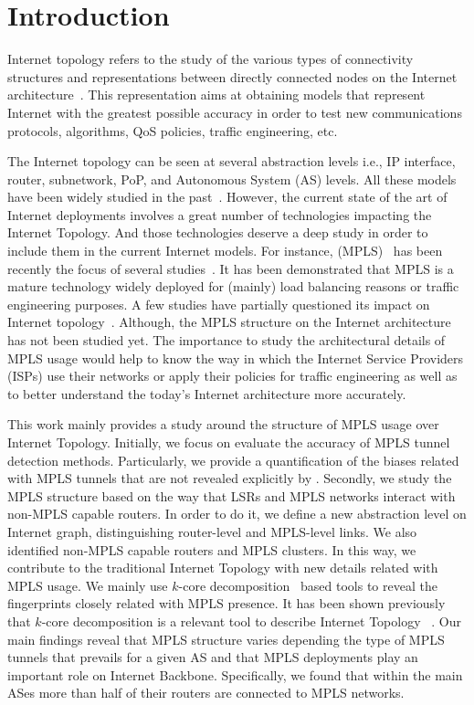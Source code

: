 \section{Introduction}\label{intro}
Internet topology refers to the study of the various types of
connectivity structures and representations between directly connected nodes on
the Internet architecture~\cite{Calvert97}. This representation aims at
obtaining models that represent  Internet with the greatest possible accuracy in order
to test new communications protocols, algorithms, QoS policies, traffic
engineering, etc.

The Internet topology can be seen at several abstraction levels i.e., IP
interface, router, subnetwork, PoP, and Autonomous System (AS) levels. All these
models have been widely studied in the past~\cite{DONNET13}. However, the
current state of the art of Internet deployments involves a great number of
technologies impacting the  Internet Topology.  And those technologies deserve a
deep study in order to include them in the current Internet models.  For instance, 
 (MPLS)~\cite{rfc3031} has been recently the
focus of several studies~\cite{SOM11,Donnet12,Vanaubel15}.  It has been
demonstrated that MPLS is a mature technology widely deployed for (mainly) load
balancing reasons or traffic engineering purposes.  A few studies have
partially questioned its impact on Internet topology~\cite{BRICE07,Flach2012}. 
Although, the MPLS structure on the Internet architecture has not been	
studied yet.  The importance to study  the architectural details of MPLS usage 
would help to know the way in
which the Internet Service Providers (ISPs) use their networks or apply their
policies for traffic engineering as well as to better understand the today's
Internet architecture more accurately. 

This work mainly provides a study around the
structure of MPLS usage over Internet Topology. Initially, we focus on evaluate the
accuracy of MPLS tunnel detection methods. Particularly, we provide a quantification 
of the biases related with MPLS tunnels that are not revealed explicitly by \traceroute.
Secondly, we study the MPLS structure based on the way that LSRs and MPLS networks interact with non-MPLS capable routers. In order to do it, we define a new abstraction level on 
Internet graph, distinguishing  router-level and MPLS-level links. We also
identified non-MPLS capable routers and  MPLS clusters. In this way, we contribute to 
the traditional Internet Topology with new details related with MPLS usage.
We mainly use $k$-core decomposition~\cite{batagelj2002} based tools to reveal the fingerprints
closely related with MPLS presence. It has been shown
previously that $k$-core decomposition is a relevant tool to describe
Internet Topology ~\cite{Alvarez06k, Serrano06, Alvarez08k}. 
Our main findings reveal that MPLS
structure varies depending the type of MPLS tunnels that prevails for a given
AS and that MPLS deployments play an important role on Internet Backbone. Specifically,
we found that within the main ASes more than half of their routers are connected to MPLS networks.


